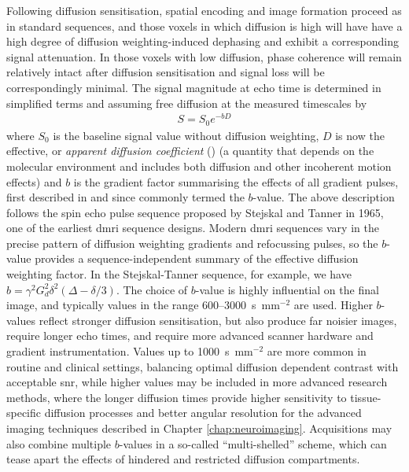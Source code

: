Following diffusion sensitisation, spatial encoding and image formation proceed as in standard sequences, and those voxels in which diffusion is high will have have a high degree of diffusion weighting-induced dephasing and exhibit a corresponding signal attenuation.
In those voxels with low diffusion, phase coherence will remain relatively intact after diffusion sensitisation and signal loss will be correspondingly minimal.
The signal magnitude at echo time is determined in simplified terms and assuming free diffusion at the measured timescales by
\begin{align}
    S = S_0e^{-bD}
\end{align}\label{eq:S}
where $S_0$ is the baseline signal value without diffusion weighting, $D$ is now the effective, or \textit{apparent diffusion coefficient} ()\autocite{Basser1994,Beaulieu2002} (a quantity that depends on the molecular environment and includes both diffusion and other incoherent motion effects) and $b$ is the gradient factor summarising the effects of all gradient pulses, first described in \textcite{LeBihan1986} and since commonly termed the $b$-value.
The above description follows the spin echo pulse sequence proposed by Stejskal and Tanner in 1965\autocite{Stejskal1965}, one of the earliest \gls{dmri} sequence designs.
Modern \gls{dmri} sequences vary in the precise pattern of diffusion weighting gradients and refocussing pulses, so the $b$-value provides a sequence-independent summary of the effective diffusion weighting factor.
In the Stejskal-Tanner sequence, for example, we have $b = \gamma^2 G_d^2 \delta^2 (\Delta-\delta/3)$.
The choice of $b$-value is highly influential on the final image, and typically values in the range 600--3000~s~mm$^{-2}$ are used.
Higher $b$-values reflect stronger diffusion sensitisation, but also produce far noisier images, require longer echo times, and require more advanced scanner hardware and gradient instrumentation\autocite{Tournier2011}.
Values up to 1000~s~mm$^{-2}$ are more common in routine and clinical settings, balancing optimal diffusion dependent contrast with acceptable \gls{snr}, while higher values may be included in more advanced research methods\autocite{Roberts2007}, where the longer diffusion times provide higher sensitivity to tissue-specific diffusion processes and better angular resolution for the advanced imaging techniques described in Chapter \ref{chap:neuroimaging}.
Acquisitions may also combine multiple $b$-values in a so-called ``multi-shelled'' scheme, which can tease apart the effects of hindered and restricted diffusion compartments\autocite{Clark2002,Assaf2005}.

